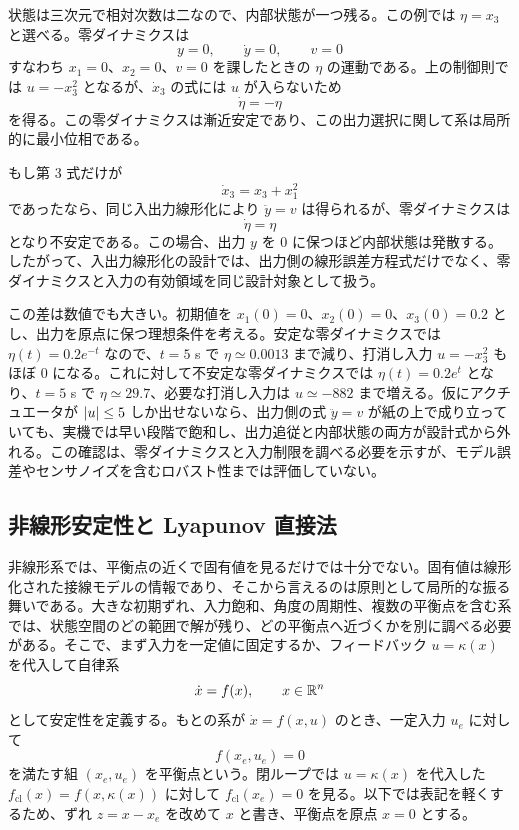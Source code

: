\begin{example}[零ダイナミクスをもつ入出力線形化]
状態は三次元で相対次数は二なので、内部状態が一つ残る。この例では $\eta=x_3$ と選べる。零ダイナミクスは
\begin{equation}
  y=0,\qquad \dot{y}=0,\qquad v=0
\end{equation}
すなわち $x_1=0$、$x_2=0$、$v=0$ を課したときの $\eta$ の運動である。上の制御則では $u=-x_3^2$ となるが、$\dot{x}_3$ の式には $u$ が入らないため
\begin{equation}
  \dot{\eta}=-\eta
\end{equation}
を得る。この零ダイナミクスは漸近安定であり、この出力選択に関して系は局所的に最小位相である。

もし第 3 式だけが
\begin{equation}
  \dot{x}_3=x_3+x_1^2
\end{equation}
であったなら、同じ入出力線形化により $\ddot{y}=v$ は得られるが、零ダイナミクスは
\begin{equation}
  \dot{\eta}=\eta
\end{equation}
となり不安定である。この場合、出力 $y$ を 0 に保つほど内部状態は発散する。したがって、入出力線形化の設計では、出力側の線形誤差方程式だけでなく、零ダイナミクスと入力の有効領域を同じ設計対象として扱う。

この差は数値でも大きい。初期値を $x_1(0)=0$、$x_2(0)=0$、$x_3(0)=0.2$ とし、出力を原点に保つ理想条件を考える。安定な零ダイナミクスでは $\eta(t)=0.2e^{-t}$ なので、$t=5$ s で $\eta\simeq0.0013$ まで減り、打消し入力 $u=-x_3^2$ もほぼ 0 になる。これに対して不安定な零ダイナミクスでは $\eta(t)=0.2e^{t}$ となり、$t=5$ s で $\eta\simeq29.7$、必要な打消し入力は $u\simeq-882$ まで増える。仮にアクチュエータが $\left|u\right|\le5$ しか出せないなら、出力側の式 $\ddot{y}=v$ が紙の上で成り立っていても、実機では早い段階で飽和し、出力追従と内部状態の両方が設計式から外れる。この確認は、零ダイナミクスと入力制限を調べる必要を示すが、モデル誤差やセンサノイズを含むロバスト性までは評価していない。
\end{example}

\subsection{非線形安定性と Lyapunov 直接法}

非線形系では、平衡点の近くで固有値を見るだけでは十分でない。固有値は線形化された接線モデルの情報であり、そこから言えるのは原則として局所的な振る舞いである。大きな初期ずれ、入力飽和、角度の周期性、複数の平衡点を含む系では、状態空間のどの範囲で解が残り、どの平衡点へ近づくかを別に調べる必要がある。そこで、まず入力を一定値に固定するか、フィードバック $u=\kappa(x)$ を代入して自律系
\begin{equation}
  \dot{x}=f(x),\qquad x\in\mathbb{R}^n
\end{equation}
として安定性を定義する。もとの系が $\dot{x}=f(x,u)$ のとき、一定入力 $u_e$ に対して
\begin{equation}
  f(x_e,u_e)=0
\end{equation}
を満たす組 $(x_e,u_e)$ を平衡点という。閉ループでは $u=\kappa(x)$ を代入した $f_\text{cl}(x)=f(x,\kappa(x))$ に対して $f_\text{cl}(x_e)=0$ を見る。以下では表記を軽くするため、ずれ $z=x-x_e$ を改めて $x$ と書き、平衡点を原点 $x=0$ とする。

